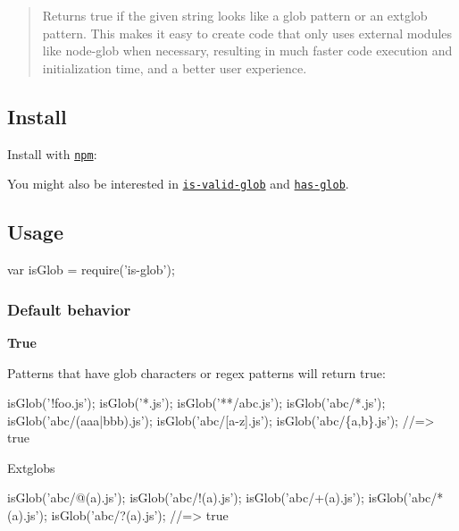 \begin{quote}
Returns {\ttfamily true} if the given string looks like a glob pattern or an extglob pattern. This makes it easy to create code that only uses external modules like node-\/glob when necessary, resulting in much faster code execution and initialization time, and a better user experience. \end{quote}


\subsection*{Install}

Install with \href{https://www.npmjs.com/}{\tt npm}\+:




You might also be interested in \href{https://github.com/jonschlinkert/is-valid-glob}{\tt is-\/valid-\/glob} and \href{https://github.com/jonschlinkert/has-glob}{\tt has-\/glob}.

\subsection*{Usage}


\begin{DoxyCode}
var isGlob = require('is-glob');
\end{DoxyCode}


\subsubsection*{Default behavior}

{\bfseries True}

Patterns that have glob characters or regex patterns will return {\ttfamily true}\+:


\begin{DoxyCode}
isGlob('!foo.js');
isGlob('*.js');
isGlob('**/abc.js');
isGlob('abc/*.js');
isGlob('abc/(aaa|bbb).js');
isGlob('abc/[a-z].js');
isGlob('abc/\{a,b\}.js');
//=> true
\end{DoxyCode}


Extglobs


\begin{DoxyCode}
isGlob('abc/@(a).js');
isGlob('abc/!(a).js');
isGlob('abc/+(a).js');
isGlob('abc/*(a).js');
isGlob('abc/?(a).js');
//=> true
\end{DoxyCode}


